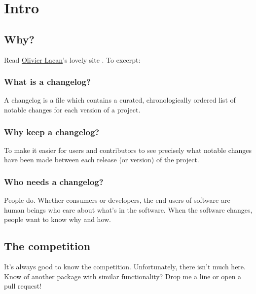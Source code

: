 \documentclass{ltxdoc}
\begin{document}
\section{Intro}

\subsection{Why?}

Read \href{https://olivierlacan.com/}{Olivier Lacan}'s lovely site
\keepachangelog. To excerpt:

\begin{adjustwidth}{1in}{1in}
	\subsubsection{What is a changelog?}
	A changelog is a file which contains a curated, chronologically
	ordered list of notable changes for each version of a project.

	\subsubsection{Why keep a changelog?}
	To make it easier for users and contributors to see precisely what
	notable changes have been made between each release (or version) of
	the project.

	\subsubsection{Who needs a changelog?}
	People do. Whether consumers or developers, the end users of
	software are human beings who care about what's in the software.
	When the software changes, people want to know why and how.
\end{adjustwidth}

\subsection{The competition}

It's always good to know the competition. Unfortunately, there isn't much
here. Know of another package with similar functionality? Drop me a line or
open a pull request!
\end{document}
